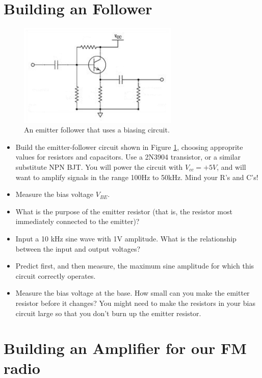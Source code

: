 \documentclass[11pt]{article}
\begin{document}
\section{Building an Follower}

\begin{figure}[h!]\centering
\includegraphics[width=3in]{analog_lab_2_plots/biased_emitter_follower.png}
\caption{An emitter follower that uses a biasing circuit.}
\label{fig:emitter_follower}
\end{figure}

\begin{itemize}
\item Build the emitter-follower circuit shown in Figure \ref{fig:emitter_follower}, choosing approprite
values for resistors and capacitors.  Use a 2N3904 transistor, or a similar substitute NPN BJT.  You will
power the circuit with $V_{cc}=+5V$, and will want to amplify signals in the range 100Hz to 50kHz.  Mind
your R's and C's!
\item Measure the bias voltage $V_{BE}$.
\item What is the purpose of the emitter resistor (that is, the resistor most immediately connected to the
emitter)?
\item Input a 10 kHz sine wave with 1V amplitude.  What is the relationship between the input and output voltages?
\item Predict first, and then measure, the maximum sine amplitude for which this circuit correctly operates.
\item Measure the bias voltage at the base.  How small can you make the emitter resistor before it changes?  You
might need to make the resistors in your bias circuit large so that you don't burn up the emitter resistor.
\end{itemize}

\section{Building an Amplifier for our FM radio}
\end{document}
